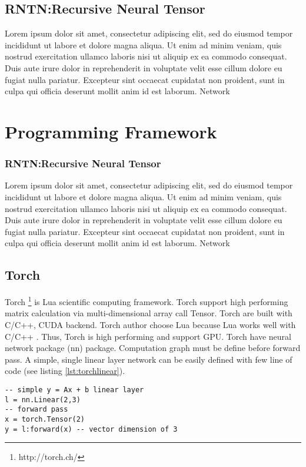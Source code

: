 \subsection{RNTN:Recursive Neural Tensor}
Lorem ipsum dolor sit amet, consectetur adipiscing elit, sed do eiusmod tempor incididunt ut labore et dolore magna aliqua. Ut enim ad minim veniam, quis nostrud exercitation ullamco laboris nisi ut aliquip ex ea commodo consequat. Duis aute irure dolor in reprehenderit in voluptate velit esse cillum dolore eu fugiat nulla pariatur. Excepteur sint occaecat cupidatat non proident, sunt in culpa qui officia deserunt mollit anim id est laborum. Network
\section{Programming Framework}
\subsubsection{RNTN:Recursive Neural Tensor}
Lorem ipsum dolor sit amet, consectetur adipiscing elit, sed do eiusmod tempor incididunt ut labore et dolore magna aliqua. Ut enim ad minim veniam, quis nostrud exercitation ullamco laboris nisi ut aliquip ex ea commodo consequat. Duis aute irure dolor in reprehenderit in voluptate velit esse cillum dolore eu fugiat nulla pariatur. Excepteur sint occaecat cupidatat non proident, sunt in culpa qui officia deserunt mollit anim id est laborum. Network
\subsection{Torch}
Torch \footnote{http://torch.ch/} is Lua scientific computing framework. Torch support high performing matrix calculation via multi-dimensional array call Tensor. Torch are built with C/C++, CUDA backend. Torch author choose Lua because Lua works well with C/C++ \cite{collobert2011torch7}.  Thus, Torch is high performing and support GPU. Torch have neural network package (nn) package. Computation graph must be define before forward pass. 
A simple, single linear layer network can be easily defined with few line of code (see listing \ref{lst:torchlinear}).

\begin{lstlisting}[caption={Simple linear layer in Torch},label={lst:torchlinear}, language={[5.1]Lua}]
-- simple y = Ax + b linear layer
l = nn.Linear(2,3)
-- forward pass
x = torch.Tensor(2)
y = l:forward(x) -- vector dimension of 3
\end{lstlisting}

